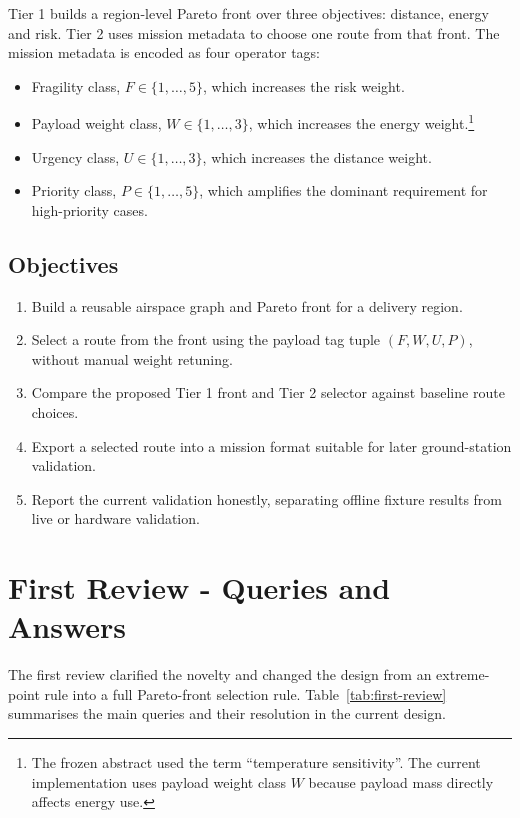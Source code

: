 \documentclass{ssnreview}
\newcommand{\tagtuple}{(F,W,U,P)}
\begin{document}
Tier 1 builds a region-level Pareto front over three objectives: distance, energy and risk. Tier 2 uses mission
metadata to choose one route from that front. The mission metadata is encoded as four operator tags:
\begin{itemize}
  \item Fragility class, \(F \in \{1,\ldots,5\}\), which increases the risk weight.
  \item Payload weight class, \(W \in \{1,\ldots,3\}\), which increases the energy weight.\footnote{The frozen
  abstract used the term ``temperature sensitivity''. The current implementation uses payload weight class \(W\)
  because payload mass directly affects energy use.}
  \item Urgency class, \(U \in \{1,\ldots,3\}\), which increases the distance weight.
  \item Priority class, \(P \in \{1,\ldots,5\}\), which amplifies the dominant requirement for high-priority cases.
\end{itemize}

\section{Objectives}
\begin{enumerate}[label=\arabic*.]
  \item Build a reusable airspace graph and Pareto front for a delivery region.
  \item Select a route from the front using the payload tag tuple \(\tagtuple\), without manual weight retuning.
  \item Compare the proposed Tier 1 front and Tier 2 selector against baseline route choices.
  \item Export a selected route into a mission format suitable for later ground-station validation.
  \item Report the current validation honestly, separating offline fixture results from live or hardware validation.
\end{enumerate}

\chapter{First Review - Queries and Answers}
The first review clarified the novelty and changed the design from an extreme-point rule into a full Pareto-front
selection rule. Table~\ref{tab:first-review} summarises the main queries and their resolution in the current design.
\end{document}
